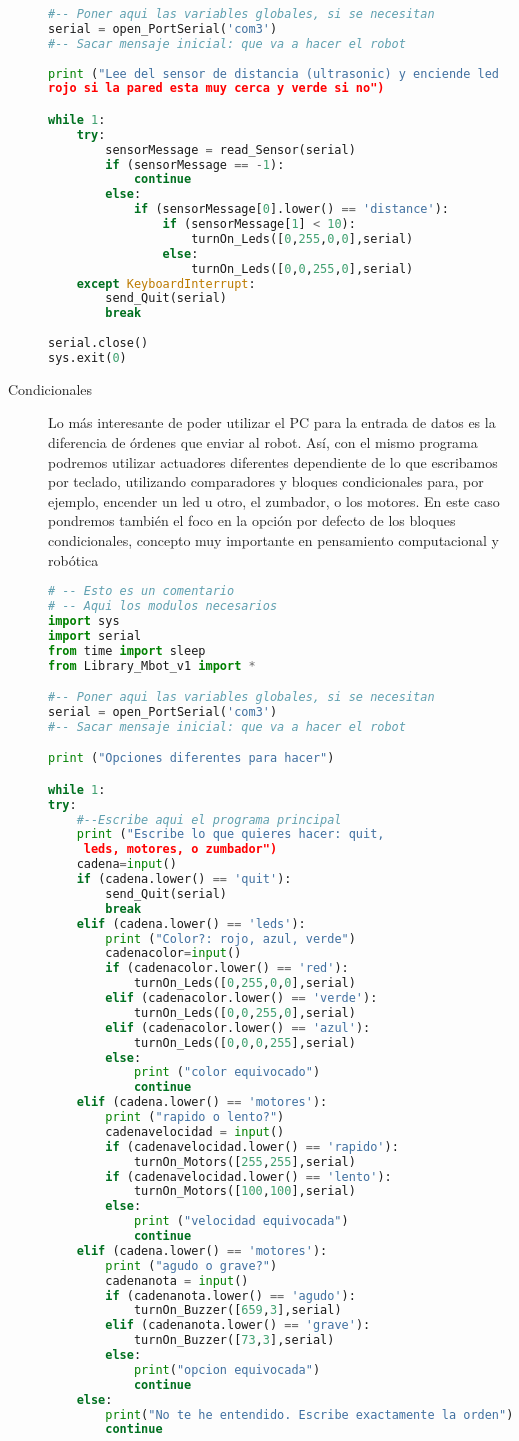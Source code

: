 \begin{description}
\begin{lstlisting}[language=python,caption={Solución de referencia del ejercicio},captionpos=b,tabsize=2,tabsize=2]
#-- Poner aqui las variables globales, si se necesitan
serial = open_PortSerial('com3')
#-- Sacar mensaje inicial: que va a hacer el robot
	
print ("Lee del sensor de distancia (ultrasonic) y enciende led 
rojo si la pared esta muy cerca y verde si no")

while 1:
	try:
		sensorMessage = read_Sensor(serial)    
		if (sensorMessage == -1):
			continue
		else:
			if (sensorMessage[0].lower() == 'distance'):
				if (sensorMessage[1] < 10):
					turnOn_Leds([0,255,0,0],serial)
				else:
					turnOn_Leds([0,0,255,0],serial)
	except KeyboardInterrupt:
		send_Quit(serial)
		break
	
serial.close()
sys.exit(0)
\end{lstlisting}
	\item [Condicionales] Lo más interesante de poder utilizar el PC para la entrada de datos es la diferencia de órdenes que enviar al robot. Así, con el mismo programa podremos utilizar actuadores diferentes dependiente de lo que escribamos por teclado, utilizando comparadores y bloques condicionales para, por ejemplo, encender un led u otro, el zumbador, o los motores. En este caso pondremos también el foco en la opción por defecto de los bloques condicionales, concepto muy importante en pensamiento computacional y robótica
\begin{lstlisting}[language=python,caption={Solución de referencia del ejercicio},captionpos=b,tabsize=2,tabsize=2]
# -- Esto es un comentario		
# -- Aqui los modulos necesarios
import sys
import serial
from time import sleep
from Library_Mbot_v1 import *

#-- Poner aqui las variables globales, si se necesitan
serial = open_PortSerial('com3')
#-- Sacar mensaje inicial: que va a hacer el robot

print ("Opciones diferentes para hacer")

while 1:
try:
	#--Escribe aqui el programa principal
	print ("Escribe lo que quieres hacer: quit,
	 leds, motores, o zumbador")
	cadena=input()
	if (cadena.lower() == 'quit'):
		send_Quit(serial)
		break
	elif (cadena.lower() == 'leds'):
		print ("Color?: rojo, azul, verde")
		cadenacolor=input()
		if (cadenacolor.lower() == 'red'):
			turnOn_Leds([0,255,0,0],serial)
		elif (cadenacolor.lower() == 'verde'):
			turnOn_Leds([0,0,255,0],serial)
		elif (cadenacolor.lower() == 'azul'):
			turnOn_Leds([0,0,0,255],serial)
		else:
			print ("color equivocado")
			continue
	elif (cadena.lower() == 'motores'):
		print ("rapido o lento?")
		cadenavelocidad = input()
		if (cadenavelocidad.lower() == 'rapido'):
			turnOn_Motors([255,255],serial)
		if (cadenavelocidad.lower() == 'lento'):
			turnOn_Motors([100,100],serial)
		else:
			print ("velocidad equivocada")
			continue
	elif (cadena.lower() == 'motores'):
		print ("agudo o grave?")
		cadenanota = input()
		if (cadenanota.lower() == 'agudo'):
			turnOn_Buzzer([659,3],serial)
		elif (cadenanota.lower() == 'grave'):
			turnOn_Buzzer([73,3],serial)
		else:
			print("opcion equivocada")
			continue
	else:
		print("No te he entendido. Escribe exactamente la orden")
		continue


\end{lstlisting}
\end{description}
